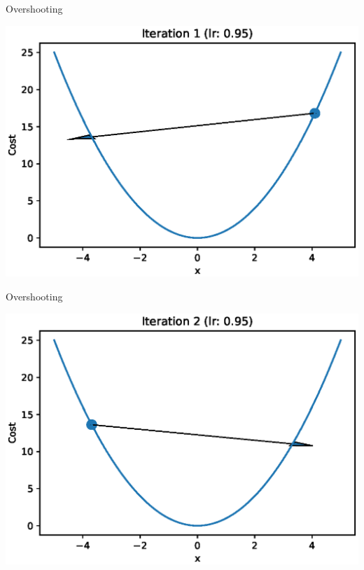 \documentclass{beamer}
\begin{document}
	\begin{frame}{Overshooting}
		\begin{center}
			\includegraphics[totalheight=6cm]{gradient-descent/overshooting-1.eps}
		\end{center}
	\end{frame}
	
	\begin{frame}{Overshooting}
		\begin{center}
			\includegraphics[totalheight=6cm]{gradient-descent/overshooting-2.eps}
		\end{center}
	\end{frame}
	
\end{document}
